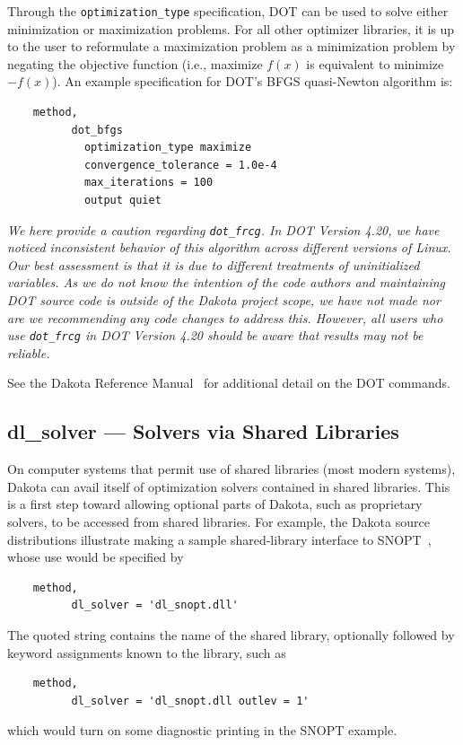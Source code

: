 Through the \texttt{optimization\_type} specification, DOT can be used
to solve either minimization or maximization problems. For all other
optimizer libraries, it is up to the user to reformulate a
maximization problem as a minimization problem by negating the
objective function (i.e., maximize $f(x)$ is equivalent to minimize
$-f(x)$). An example specification for DOT's BFGS quasi-Newton
algorithm is:
\begin{small}
\begin{verbatim}
    method,
          dot_bfgs
            optimization_type maximize
            convergence_tolerance = 1.0e-4
            max_iterations = 100
            output quiet
\end{verbatim}
\end{small}

\emph{We here provide a caution regarding \texttt{dot\_frcg}.  In DOT
Version 4.20, we have noticed inconsistent behavior of this algorithm
across different versions of Linux.  Our best assessment is that it is
due to different treatments of uninitialized variables.  As we do not
know the intention of the code authors and maintaining DOT source code
is outside of the Dakota project scope, we have not made nor are we
recommending any code changes to address this.  However, all users who
use \texttt{dot\_frcg} in DOT Version 4.20 should be aware that
results may not be reliable.}

See the Dakota
Reference Manual~\cite{RefMan} for additional detail on the DOT
commands. 

\subsection{dl\_solver --- Solvers via Shared Libraries}\label{opt:software:dlsolver}

On computer systems that permit use of shared libraries (most modern systems),
Dakota can avail itself of optimization solvers contained in shared libraries.
This is a first step toward allowing optional parts of Dakota, such as
proprietary solvers, to be accessed from shared libraries.  For example,
the Dakota source distributions illustrate making
a sample shared-library interface to SNOPT~\cite{GilMS05},
whose use would be specified by
\begin{small}
\begin{verbatim}
    method,
          dl_solver = 'dl_snopt.dll'
\end{verbatim}
\end{small}
The quoted string contains the name of the shared library, optionally
followed by keyword assignments known to the library, such as
\begin{small}
\begin{verbatim}
    method,
          dl_solver = 'dl_snopt.dll outlev = 1'
\end{verbatim}
\end{small}
which would turn on some diagnostic printing in the SNOPT example.

